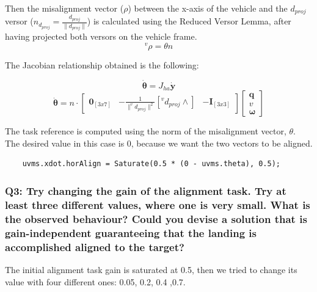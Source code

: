 \documentclass{article}
\begin{document}
Then the misalignment vector (\(\rho\)) between the x-axis of the vehicle and the \(d_{proj}\) versor (\(n_{d_{proj}}=\frac{d_{proj}}{\|d_{proj}\|}\)) is calculated using the Reduced Versor Lemma, after having projected both versors on the vehicle frame.
$$^v\rho = \theta n$$

The Jacobian relationship obtained is the following:

$$ \bm{\dot{\theta}} = J_{ha} \bm{\dot{y}}$$
$$ \bm{\dot{\theta}} = n \cdot \begin{bmatrix} \bm{0}_{[3x7]} & -\frac{1}{\|^vd_{proj}\|^2}[^vd_{proj}\wedge] & -\bm{I}_{[3x3]} \end{bmatrix} \begin{bmatrix} \bm{q}   \\ \bm{\textit{v}} \\ \bm{\omega} \end{bmatrix} $$

The task reference is computed using the norm of the misalignment vector, $\theta$. The desired value in this case is \(0\), because we want the two vectors to be aligned.

\begin{lstlisting}
	uvms.xdot.horAlign = Saturate(0.5 * (0 - uvms.theta), 0.5);
\end{lstlisting}

\subsubsection{Q3: Try changing the gain of the alignment task. Try at least three different values, where one is very small. What is the observed behaviour? Could you devise a solution that is gain-independent guaranteeing that the landing is accomplished aligned to the target?}
The initial alignment task gain is saturated at 0.5, then we tried to change its value with four different ones: 0.05, 0.2, 0.4 ,0.7.

\begin{figure}[H]
	\centering
	\hspace{10mm}
	\label{im:v_land_gain0_05}
\end{figure} 

\begin{figure}[H]
	\centering
	\hspace{10mm}
	\label{im:v_land_gain0_2}
\end{figure} 
\end{document}

